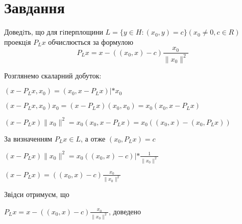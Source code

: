 
\chapter{Завдання \theHchapter}


\begin{tcolorbox}[title=Завдання]
    
    Доведiть, що для гiперплощини 
    $ L = \{y \in H : (x_0, y) = c\} (x_0 \neq 0, c \in R)$
    проекцiя $P_Lx$ обчислюється за формулою
    $$ P_Lx = x - ((x_0, x) - c) \frac{x_0}{\| x_0 \| ^ 2} $$
    
\end{tcolorbox}


Розглянемо скаларний добуток:

$ (x - P_Lx, x_0) = (x_0, x - P_Lx) | * x_0$


$ (x - P_Lx, x_0) x_0 = (x - P_Lx) (x_0, x_0) = x_0 (x_0, x - P_Lx) $


$ (x - P_Lx) \| x_0\|^2 = x_0 (x_0, x - P_Lx) 
= x_0 ((x_0, x) - (x_0, P_Lx)) $


За визначенням $ P_Lx \in L$, а отже $(x_0, P_Lx) = c$


$ (x - P_Lx) \| x_0\|^2 = x_0 ((x_0, x) - c) | * \frac{1}{\|x_0\|^2}$


$ (x - P_Lx) = ((x_0, x) - c) \frac{x_0}{\| x_0\|^2 } $


Звідси отримуєм, що 

$ P_Lx = x - ((x_0, x) - c) \frac{x_0}{\| x_0 \| ^ 2} $, доведено